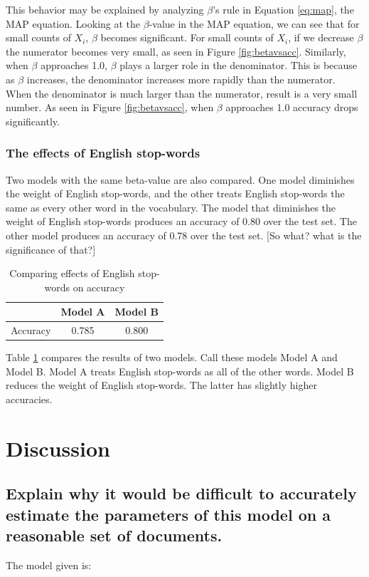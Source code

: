 \documentclass{IEEEtran}
\begin{document}
This behavior may be explained by analyzing $\beta$'s rule in Equation \ref{eq:map}, the MAP equation. Looking at the $\beta$-value in the MAP equation, we can see that for small counts of $X_i$, $\beta$ becomes significant. For small counts of $X_i$, if we decrease $\beta$ the numerator becomes very small, as seen in Figure \ref{fig:betavsacc}. Similarly, when $\beta$ approaches 1.0, $\beta$ plays a larger role in the denominator. This is because as $\beta$ increases, the denominator increases more rapidly than the numerator. When the denominator is much larger than the numerator, result is a very small number. As seen in Figure \ref{fig:betavsacc}, when $\beta$ approaches 1.0 accuracy drops significantly.

\subsubsection{The effects of English stop-words}
Two models with the same beta-value are also compared. One model diminishes the weight of English stop-words, and the other treats English stop-words the same as every other word in the vocabulary. The model that diminishes the weight of English stop-words produces an accuracy of 0.80 over the test set. The other model produces an accuracy of 0.78 over the test set. [So what? what is the significance of that?]

\begin{table}[ht]
  \caption{Comparing effects of English stop-words on accuracy}
  \centering
  \begin{tabular}{c c c }
  \hline\hline
           & Model A & Model B \\ [0.5ex]
  \hline
  Accuracy &   0.785 &   0.800 \\ [1ex]
  \hline
  \end{tabular}
  \label{table:stopwords}
\end{table}

Table \ref{table:stopwords} compares the results of two models. Call these models Model A and Model B. Model A treats English stop-words as all of the other words. Model B reduces the weight of English stop-words. The latter has slightly higher accuracies.

\section{Discussion}

\subsection{Explain why it would be difficult to accurately estimate the parameters of this model on a reasonable set of documents.}
The model given is:
\end{document}

